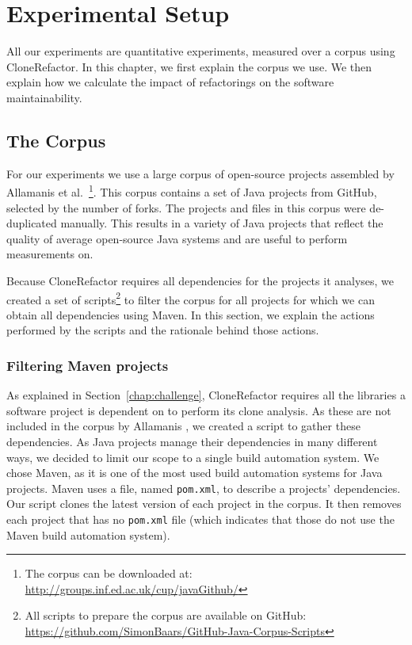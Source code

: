 \chapter{Experimental Setup}\label{ch:experimentalsetup}
All our experiments are quantitative experiments, measured over a corpus using CloneRefactor. In this chapter, we first explain the corpus we use. We then explain how we calculate the impact of refactorings on the software maintainability.

\section{The Corpus}\label{chap:corpus}
For our experiments we use a large corpus of open-source projects assembled by Allamanis et al.~\cite{githubCorpus2013}\footnote{The corpus can be downloaded at: \url{http://groups.inf.ed.ac.uk/cup/javaGithub/}}. This corpus contains a set of Java projects from GitHub, selected by the number of forks. The projects and files in this corpus were de-duplicated manually. This results in a variety of Java projects that reflect the quality of average open-source Java systems and are useful to perform measurements on.

Because CloneRefactor requires all dependencies for the projects it analyses, we created a set of scripts\footnote{All scripts to prepare the corpus are available on GitHub: \url{https://github.com/SimonBaars/GitHub-Java-Corpus-Scripts}} to filter the corpus for all projects for which we can obtain all dependencies using Maven. In this section, we explain the actions performed by the scripts and the rationale behind those actions.

\subsection{Filtering Maven projects}
As explained in Section~\ref{chap:challenge}, CloneRefactor requires all the libraries a software project is dependent on to perform its clone analysis. As these are not included in the corpus by Allamanis \cite{githubCorpus2013}, we created a script to gather these dependencies. As Java projects manage their dependencies in many different ways, we decided to limit our scope to a single build automation system. We chose Maven, as it is one of the most used build automation systems for Java projects. Maven uses a file, named \texttt{pom.xml}, to describe a projects' dependencies. Our script clones the latest version of each project in the corpus. It then removes each project that has no \texttt{pom.xml} file (which indicates that those do not use the Maven build automation system).

